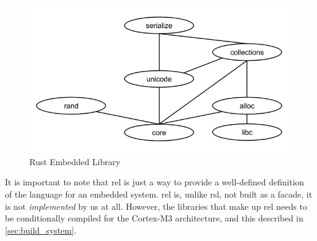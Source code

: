 \begin{figure}[H]
  \begin{center}
    \includegraphics[scale=0.3]{figures/background/rust/embedded-rust-lib.png}
  \end{center}
  \caption{Rust Embedded Library}
  \label{fig:rust:rel}
\end{figure}

It is important to note that \gls{rel} is just a way to provide a well-defined definition of the {\rust} language for an embedded system.
\gls{rel} is, unlike \gls{rsl}, not built as a facade, it is not \emph{implemented} by us at all.
However, the libraries that make up \gls{rel} needs to be conditionally compiled for the Cortex-M3 architecture, and this described in \autoref{sec:build_system}.
